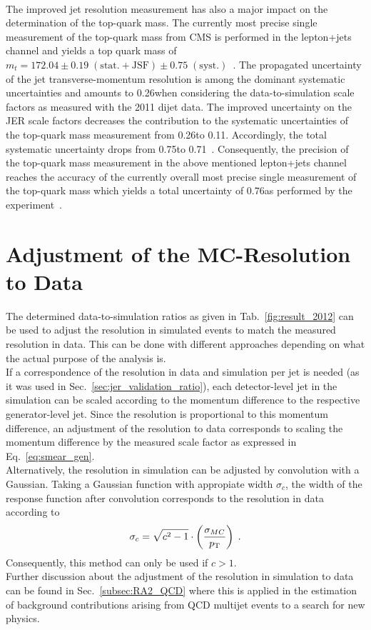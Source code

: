 \\
The improved jet resolution measurement has also a major impact on the determination of the top-quark mass. The currently most precise single measurement of the top-quark mass from CMS is performed in the lepton+jets channel and yields a top quark mass of $m_t = 172.04 \pm 0.19\; \mathrm{(stat.+JSF)} \pm 0.75\;\mathrm{(syst.)}$\gev~\cite{CMS-PAS-TOP-14-001}. The propagated uncertainty of the jet transverse-momentum resolution is among the dominant systematic uncertainties and amounts to 0.26\gev when considering the data-to-simulation scale factors as measured with the 2011 dijet data. The improved uncertainty on the JER scale factors decreases the contribution to the systematic uncertainties of the top-quark mass measurement from 0.26\gev to 0.11\gev. Accordingly, the total systematic uncertainty drops from 0.75\gev to 0.71\gev~\cite{MSeidel}. Consequently, the precision of the top-quark mass measurement in the above mentioned lepton+jets channel reaches the accuracy of the currently overall most precise single measurement of the top-quark mass which yields a total uncertainty of 0.76\gev as performed by the \dzero experiment~\cite{Abazov:2014dpa}.   

\section{Adjustment of the MC-Resolution to Data}
\label{sec:jer_adjustment}
The determined data-to-simulation ratios as given in Tab.~\ref{fig:result_2012} can be used to adjust the resolution in simulated events to match the measured resolution in data. This can be done with different approaches depending on what the actual purpose of the analysis is. \\
If a correspondence of the resolution in data and simulation per jet is needed (as it was used in Sec.~\ref{sec:jer_validation_ratio}), each detector-level jet in the simulation can be scaled according to the momentum difference to the respective generator-level jet. Since the resolution is proportional to this momentum difference, an adjustment of the resolution to data corresponds to scaling the momentum difference by the measured scale factor as expressed in Eq.~\ref{eq:smear_gen}. \\
Alternatively, the resolution in simulation can be adjusted by convolution with a Gaussian. Taking a Gaussian function with appropiate width $\sigma_{c}$, the width of the response function after convolution corresponds to the resolution in data according to 
\begin{equation}
\sigma_{c} = \sqrt{c^2-1} \cdot \left( \frac{\sigma_{MC}}{p_{\text{T}}} \right) \; .
\label{eq:res_adjust}
\end{equation}
Consequently, this method can only be used if $c > 1$. \\
Further discussion about the adjustment of the resolution in simulation to data can be found in Sec.~\ref{subsec:RA2_QCD} where this is applied in the estimation of background contributions arising from QCD multijet events to a search for new physics.  

